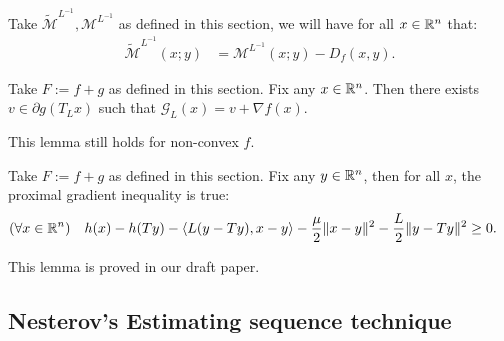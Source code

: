 \documentclass[12pt]{article}
\begin{document}
            \begin{lemma}\;\\
                Take $\widetilde{\mathcal M}^{L^{-1}}, \mathcal M^{L^{-1}}$ as defined in this section, we will have for all $x \in \mathbb R^n$ that: 
                \begin{align*}
                    \widetilde{\mathcal M}^{L^{-1}}(x; y)
                    &= 
                    \mathcal M^{L^{-1}}(x; y)- D_f(x, y).
                \end{align*}
            \end{lemma}
            \begin{lemma}
                Take $F:= f + g$ as defined in this section. 
                Fix any $x \in \mathbb R^n$. 
                Then there exists $v \in \partial g(T_L x)$ such that $\mathcal G_L (x) = v + \nabla f(x)$. 
            \end{lemma}
            \begin{remark}
                This lemma still holds for non-convex $f$. 
            \end{remark}
            \begin{lemma}\label{thm:prox-grad-ineq}
                Take $F:= f + g$ as defined in this section. 
                Fix any $y \in \mathbb R^n$, then for all $x$, the proximal gradient inequality is true: 
                \begin{align*}
                    (\forall x \in \mathbb R^n)\quad 
                    h(x)  - h(Ty) - \langle L(y - Ty), x - y\rangle
                    - \frac{\mu}{2}\Vert x - y\Vert^2 - \frac{L}{2}\Vert y - Ty\Vert^2 
                    &\ge 0. 
                \end{align*}
            \end{lemma}
            \begin{remark}
                This lemma is proved in our draft paper. 
            \end{remark}

    \subsection{Nesterov's Estimating sequence technique}
\end{document}
